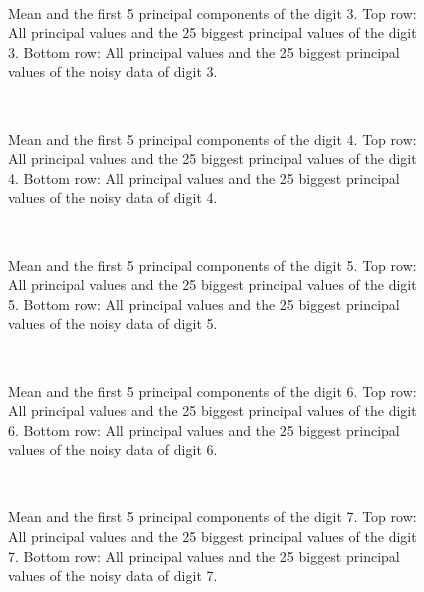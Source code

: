 \documentclass[a4paper, 12pt, titlepage]{article}
\begin{document}
\begin{figure}[H]
	\centering
	\\
	\caption{\protect{} Mean and the first 5 principal components of the digit 3. \protect{} Top row: All principal values and the 25 biggest principal values of the digit 3. Bottom row: All principal values and the 25 biggest principal values of the noisy data of digit 3.}
\end{figure}

\begin{figure}[H]
	\centering
	\\
	\caption{\protect{} Mean and the first 5 principal components of the digit 4. \protect{} Top row: All principal values and the 25 biggest principal values of the digit 4. Bottom row: All principal values and the 25 biggest principal values of the noisy data of digit 4.}
\end{figure}

\begin{figure}[H]
	\centering
	\\
	\caption{\protect{} Mean and the first 5 principal components of the digit 5. \protect{} Top row: All principal values and the 25 biggest principal values of the digit 5. Bottom row: All principal values and the 25 biggest principal values of the noisy data of digit 5.}
\end{figure}

\begin{figure}[H]
	\centering
	\\
	\caption{\protect{} Mean and the first 5 principal components of the digit 6. \protect{} Top row: All principal values and the 25 biggest principal values of the digit 6. Bottom row: All principal values and the 25 biggest principal values of the noisy data of digit 6.}
\end{figure}

\begin{figure}[H]
	\centering
	\\
	\caption{\protect{} Mean and the first 5 principal components of the digit 7. \protect{} Top row: All principal values and the 25 biggest principal values of the digit 7. Bottom row: All principal values and the 25 biggest principal values of the noisy data of digit 7.}
\end{figure}
\end{document}
